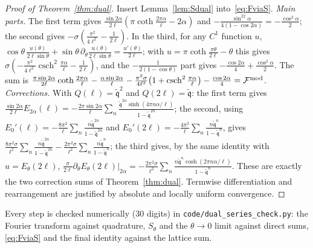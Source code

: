 \documentclass[11pt]{article}
\theoremstyle{definition}
\theoremstyle{remark}
\begin{document}
\begin{proof}[Proof of Theorem~\ref{thm:dual}]
Insert Lemma~\ref{lem:Sdual} into~\eqref{eq:FviaS}. \emph{Main parts.} The first term gives
$\frac{\sin2\alpha}{2\ell}(\pi\coth\frac{2\pi\alpha}\ell-2\alpha)$ and $-\frac{\sin^22\alpha}{4(1-\cos2\alpha)}=-\frac{\cos^2\alpha}2$; the second gives
$-\sigma(\frac{\pi^2}{4\ell^2}-\frac1{2\ell})$. In the third, for any $C^1$ function $u$,
$\cos\theta\,\frac{u(\theta)}{2\ell\sin\theta}+\sin\theta\,\partial_\theta\frac{u(\theta)}{2\ell\sin\theta}=\frac{u'(\theta)}{2\ell}$; with
$u=\pi\coth\frac{\pi\theta}{2\ell}-\theta$ this gives $\sigma(-\frac{\pi^2}{4\ell^2}\operatorname{csch}^2\frac{\pi\alpha}\ell-\frac1{2\ell})$, and the
$-\frac1{2(1-\cos\theta)}$ part gives $-\frac{\cos2\alpha}4+\frac{\cos^2\alpha}2$. The sum is
$\frac{\pi\sin2\alpha}{2\ell}\coth\frac{2\pi\alpha}\ell-\frac{\alpha\sin2\alpha}\ell-\frac{\pi^2\sigma}{4\ell^2}\big(1+\operatorname{csch}^2\frac{\pi\alpha}\ell\big)-\frac{\cos2\alpha}4=\mathcal F^{\rm mod}$.
\emph{Corrections.} With $Q(\ell)=\tilde{\mathfrak q}^2$ and $Q(2\ell)=\tilde{\mathfrak q}$: the first term gives
$\frac{\sin2\alpha}{2\ell}E_{2\alpha}(\ell)=-\frac{2\pi\sin2\alpha}\ell\sum_n\frac{\tilde{\mathfrak q}^{2n}\sinh(4\pi n\alpha/\ell)}{1-\tilde{\mathfrak q}^{2n}}$; the second, using
$E_0'(\ell)=-\frac{8\pi^2}\ell\sum_n\frac{n\tilde{\mathfrak q}^{2n}}{1-\tilde{\mathfrak q}^{2n}}$ and $E_0'(2\ell)=-\frac{4\pi^2}\ell\sum_n\frac{n\tilde{\mathfrak q}^n}{1-\tilde{\mathfrak q}^n}$, gives
$\frac{8\pi^2\sigma}{\ell^2}\sum_n\frac{n\tilde{\mathfrak q}^{2n}}{1-\tilde{\mathfrak q}^{2n}}-\frac{2\pi^2\sigma}{\ell^2}\sum_n\frac{n\tilde{\mathfrak q}^n}{1-\tilde{\mathfrak q}^n}$; the third
gives, by the same identity with $u=E_\theta(2\ell)$, $\frac\sigma{2\ell}\partial_\theta E_\theta(2\ell)|_{2\alpha}=-\frac{2\pi^2\sigma}{\ell^2}\sum_n\frac{n\tilde{\mathfrak q}^n\cosh(2\pi n\alpha/\ell)}{1-\tilde{\mathfrak q}^n}$.
These are exactly the two correction sums of Theorem~\ref{thm:dual}. Termwise differentiation and rearrangement are justified by
absolute and locally uniform convergence.
\end{proof}
Every step is checked numerically (30 digits) in \nolinkurl{code/dual_series_check.py}: the Fourier transform against quadrature,
$S_\theta$ and the $\theta\to0$ limit against direct sums, \eqref{eq:FviaS} and the final identity against the lattice sum.

\end{document}
